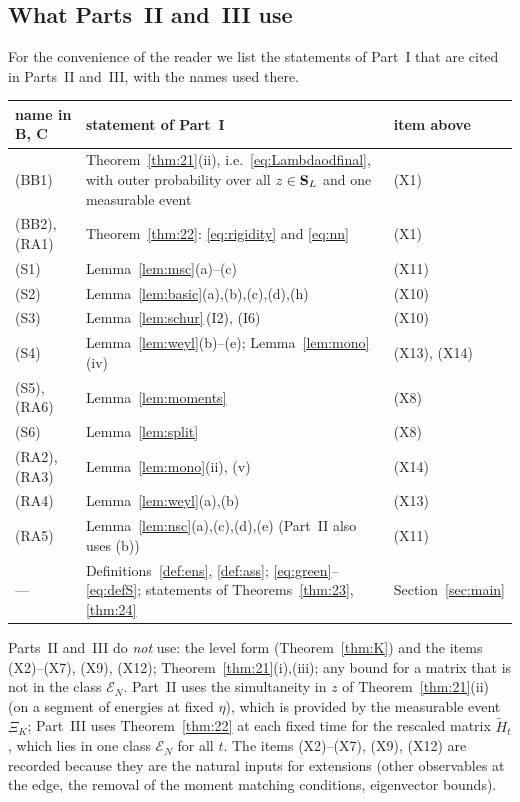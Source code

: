 \subsection{What Parts~II and~III use}\label{sec:exportuse}
For the convenience of the reader we list the statements of Part~I that are cited in Parts~II and~III, with the names used there.
\begin{center}
\renewcommand{\arraystretch}{1.12}\small
\begin{tabular}{|p{}|p{}|p{}|}
\hline
name in B, C & statement of Part~I & item above\\\hline
(BB1) & Theorem~\ref{thm:21}(ii), i.e.\ \eqref{eq:Lambdaodfinal}, with outer probability over all $z\in\mathbf{S}_L$ and one measurable event & (X1)\\
(BB2), (RA1) & Theorem~\ref{thm:22}: \eqref{eq:rigidity} and \eqref{eq:nn} & (X1)\\
(S1) & Lemma~\ref{lem:msc}(a)--(c) & (X11)\\
(S2) & Lemma~\ref{lem:basic}(a),(b),(c),(d),(h) & (X10)\\
(S3) & Lemma~\ref{lem:schur}\,(I2), (I6) & (X10)\\
(S4) & Lemma~\ref{lem:weyl}(b)--(e); Lemma~\ref{lem:mono}(iv) & (X13), (X14)\\
(S5), (RA6) & Lemma~\ref{lem:moments} & (X8)\\
(S6) & Lemma~\ref{lem:split} & (X8)\\
(RA2), (RA3) & Lemma~\ref{lem:mono}(ii), (v) & (X14)\\
(RA4) & Lemma~\ref{lem:weyl}(a),(b) & (X13)\\
(RA5) & Lemma~\ref{lem:nsc}(a),(c),(d),(e) (Part~II also uses (b)) & (X11)\\
--- & Definitions~\ref{def:ens}, \ref{def:ass}; \eqref{eq:green}--\eqref{eq:defS}; statements of Theorems~\ref{thm:23}, \ref{thm:24} & Section~\ref{sec:main}\\\hline
\end{tabular}
\end{center}
\noindent Parts~II and~III do \emph{not} use: the level form (Theorem~\ref{thm:K}) and the items (X2)--(X7), (X9), (X12); Theorem~\ref{thm:21}(i),(iii); any bound for a matrix that is not in the class $\mathcal E_N$.
Part~II uses the simultaneity in $z$ of Theorem~\ref{thm:21}(ii) (on a segment of energies at fixed $\eta$), which is provided by the measurable event $\Xi_K$; Part~III uses Theorem~\ref{thm:22} at each fixed time for the rescaled matrix $\widetilde H_t$, which lies in one class $\mathcal E_N$ for all $t$.
The items (X2)--(X7), (X9), (X12) are recorded because they are the natural inputs for extensions (other observables at the edge, the removal of the moment matching conditions, eigenvector bounds).
